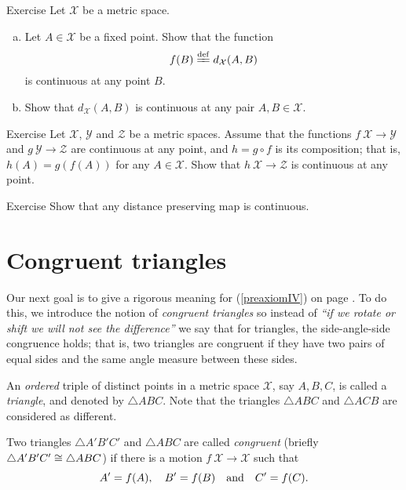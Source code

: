 \begin{thm}{Exercise}\label{ex:dist-cont}
Let $\mathcal{X}$ be a metric space.
\begin{enumerate}[(a)]
\item\label{ex:dist-cont:a} Let $A\in \mathcal{X}$ be a fixed point.
Show that the function 
$$f(B)\df
d_{\mathcal{X}}(A,B)$$ 
is continuous at any point $B$.
\item Show that $d_{\mathcal{X}}(A,B)$ is continuous  at any pair $A,B\in \mathcal{X}$.
\end{enumerate}

\end{thm}

\begin{thm}{Exercise}\label{ex:comp+cont}
Let $\mathcal{X}$, $\mathcal{Y}$ and $\mathcal{Z}$ be a metric spaces.
Assume that the functions $f\:\mathcal{X}\to\mathcal{Y}$
and $g\:\mathcal{Y}\to\mathcal{Z}$ are continuous at any point,
and $h=g\circ f$ is its composition;
that is, $h(A)=g(f(A))$ for any $A\in \mathcal{X}$.
Show that $h\:\mathcal{X}\to\mathcal{Z}$ is continuous at any point.
\end{thm}

\begin{thm}{Exercise}\label{ex:isom-cont}
Show that any distance preserving map is continuous.
\end{thm}




\section*{Congruent triangles} 

Our next goal is to give a rigorous meaning for  (\ref{preaxiomIV}) on page \pageref{preaxiomIV}.
To do this, we introduce the notion of {}\emph{congruent triangles}
so instead of {}\emph{``if we rotate or shift we will not see the difference''} we say that for triangles, the side-angle-side congruence holds;
that is, two triangles are congruent if they have two pairs of equal sides and the same angle measure between these sides.

An {}\emph{ordered} triple of distinct points in a metric space $\mathcal{X}$, 
say $A,B,C$,
is called a \emph{triangle}\label{page:def:triangle}, and denoted by $\triangle A B C$.
Note that the triangles $\triangle A B C$ and $\triangle A C B$ are considered as different.

Two triangles $\triangle A' B' C'$ and $\triangle A B C$ are called 
\emph{congruent}
(briefly $\triangle A' B' C'\z\cong\triangle A B C$) if there is a motion $f\:\mathcal{X}\to\mathcal{X}$ such that 
\[A'\z=f(A),
\quad
B'=f(B)
\quad
\text{and}
\quad
C'=f(C).\]

